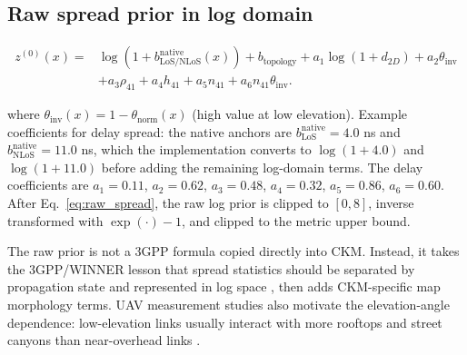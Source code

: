 \subsection{Raw spread prior in log domain}

\begin{equation}
\begin{aligned}
z^{(0)}(x)
={}&
\log\!\left(1+b^{\mathrm{native}}_{\mathrm{LoS/NLoS}}(x)\right)
+ b_{\mathrm{topology}}
+ a_1\log(1+d_{2D})
+ a_2\theta_{\mathrm{inv}}
\\
&+
a_3\rho_{41}
+ a_4 h_{41}
+ a_5 n_{41}
+ a_6 n_{41}\theta_{\mathrm{inv}} .
\end{aligned}
\label{eq:raw_spread}
\end{equation}

where $\theta_{\mathrm{inv}}(x) = 1 - \theta_{\mathrm{norm}}(x)$ (high value at low elevation). Example coefficients for delay spread: the native anchors are $b^{\mathrm{native}}_{\mathrm{LoS}} = 4.0$ ns and $b^{\mathrm{native}}_{\mathrm{NLoS}} = 11.0$ ns, which the implementation converts to $\log(1+4.0)$ and $\log(1+11.0)$ before adding the remaining log-domain terms. The delay coefficients are $a_1 = 0.11$, $a_2 = 0.62$, $a_3 = 0.48$, $a_4 = 0.32$, $a_5 = 0.86$, $a_6 = 0.60$. After Eq.~\eqref{eq:raw_spread}, the raw log prior is clipped to $[0,8]$, inverse transformed with $\exp(\cdot)-1$, and clipped to the metric upper bound.

The raw prior is not a 3GPP formula copied directly into CKM. Instead, it
takes the 3GPP/WINNER lesson that spread statistics should be separated by
propagation state and represented in log space \cite{tr38901,winner2}, then
adds CKM-specific map morphology terms. UAV measurement studies also motivate
the elevation-angle dependence: low-elevation links usually interact with more
rooftops and street canyons than near-overhead links \cite{cai2019,izydorczyk2019}.

